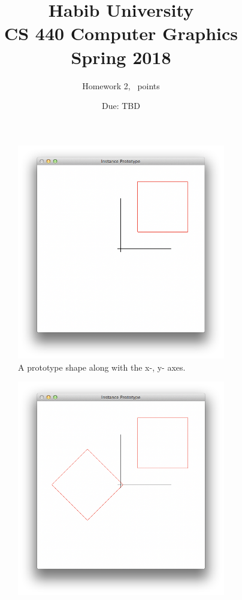 \documentclass[addpoints]{exam}
\title{Habib University\\CS 440 Computer Graphics\\Spring 2018}
\author{Homework 2, \numpoints\ points}
\date{Due: TBD}
\begin{document}
\maketitle

\begin{questions}


\begin{figure}[h]
  \begin{subfigure}[b]{.33\textwidth}
    \includegraphics[width=\textwidth]{instance1}
    \caption{A prototype shape along with the x-, y- axes.}
  \end{subfigure}
  \begin{subfigure}[b]{.33\textwidth}
    \includegraphics[width=\textwidth]{instance2}

\end{subfigure}
\end{figure}
\end{questions}
\end{document}
